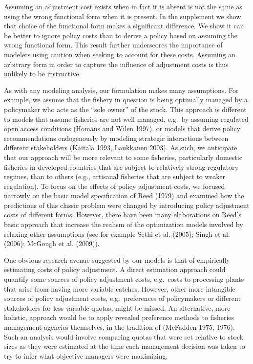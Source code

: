 \documentclass[review,12pt,author-year,titlepage]{components/elsarticle} %
\begin{document}
\begin{flushleft}
Assuming an adjustment cost exists when in fact it is absent is not the
same as using the wrong functional form when it is present. In the
supplement we show that choice of the functional form makes a
significant difference. We show it can be better to ignore policy costs
than to derive a policy based on assuming the wrong functional form.
This result further underscores the importance of modelers using caution
when seeking to account for these costs. Assuming an arbitrary form in
order to capture the influence of adjustment costs is thus unlikely to
be instructive.

As with any modeling analysis, our formulation makes many assumptions.
For example, we assume that the fishery in question is being optimally
managed by a policymaker who acts as the ``sole owner'' of the stock.
This approach is different to models that assume fisheries are not well
managed, e.g.~by assuming regulated open access conditions (Homans and
Wilen 1997), or models that derive policy recommendations endogenously
by modeling strategic interactions between different stakeholders
(Kaitala 1993, Laukkanen 2003). As such, we anticipate that our approach
will be more relevant to some fisheries, particularly domestic fisheries
in developed countries that are subject to relatively strong regulatory
regimes, than to others (e.g., artisanal fisheries that are subject to
weaker regulation). To focus on the effects of policy adjustment costs,
we focused narrowly on the basic model specification of Reed (1979) and
examined how the predictions of this classic problem were changed by
introducing policy adjustment costs of different forms. However, there
have been many elaborations on Reed's basic approach that increase the
realism of the optimization models involved by relaxing other
assumptions (see for example Sethi et al. (2005); Singh et al. (2006);
McGough et al. (2009)).

One obvious research avenue suggested by our models is that of
empirically estimating costs of policy adjustment. A direct estimation
approach could quantify some sources of policy adjustment costs,
e.g.~costs to processing plants that arise from having more variable
catches. However, other more intangible sources of policy adjustment
costs, e.g.~preferences of policymakers or different stakeholders for
less variable quotas, might be missed. An alternative, more holistic,
approach would be to apply revealed preference methods to fisheries
management agencies themselves, in the tradition of (McFadden 1975,
1976). Such an analysis would involve comparing quotas that were set
relative to stock sizes as they were estimated at the time each
management decision was taken to try to infer what objective managers
were maximizing.


\end{flushleft}
\end{document}
